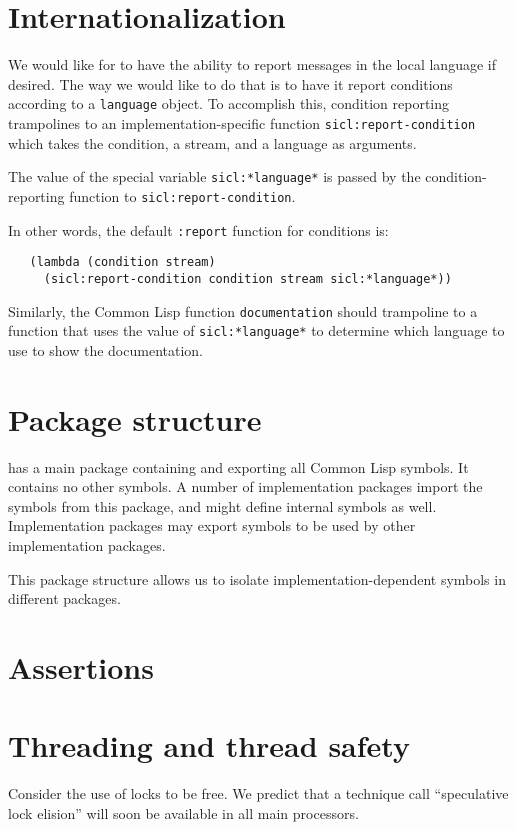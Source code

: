 \section{Internationalization}

We would like for {\sysname} to have the ability to report messages in
the local language if desired.  The way we would like to do that is to
have it report conditions according to a \texttt{language} object.  To
accomplish this, condition reporting trampolines to an
implementation-specific function \texttt{sicl:report-condition} which
takes the condition, a stream, and a language as arguments.

The value of the special variable \texttt{sicl:*language*} is passed
by the condition-reporting function to \texttt{sicl:report-condition}.

In other words, the default \texttt{:report} function for conditions is:

\begin{verbatim}
   (lambda (condition stream) 
     (sicl:report-condition condition stream sicl:*language*))
\end{verbatim}

Similarly, the Common Lisp function \texttt{documentation} should
trampoline to a function that uses the value of
\texttt{sicl:*language*} to determine which language to use to show
the documentation. 

\section{Package structure}

{\sysname} has a main package containing and exporting all Common Lisp
symbols.  It contains no other symbols.  A number of implementation
packages import the symbols from this package, and might define
internal symbols as well.  Implementation packages may export symbols
to be used by other implementation packages.

This package structure allows us to isolate implementation-dependent
symbols in different packages.  

\section{Assertions}

\section{Threading and thread safety}

Consider the use of locks to be free.  We predict that a technique
call ``speculative lock elision'' will soon be available in all main
processors.

